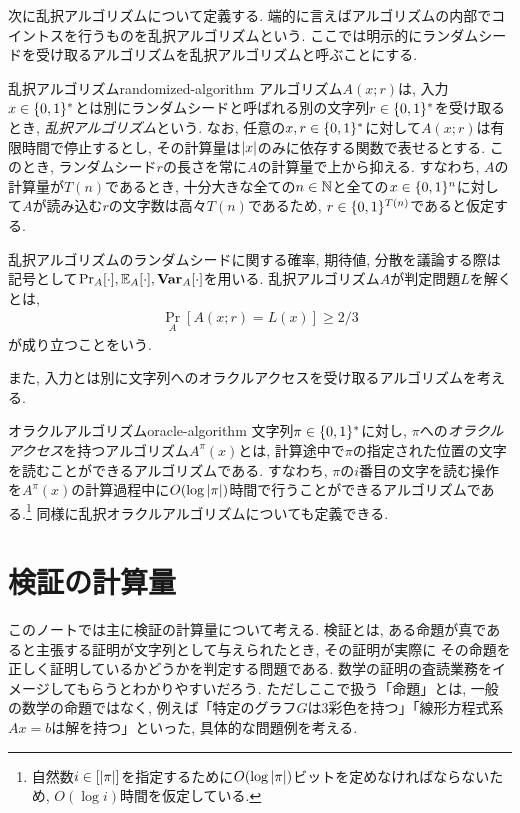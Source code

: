次に乱択アルゴリズムについて定義する. 端的に言えばアルゴリズムの内部でコイントスを行うものを乱択アルゴリズムという.
ここでは明示的にランダムシードを受け取るアルゴリズムを乱択アルゴリズムと呼ぶことにする.

\begin{definition}{乱択アルゴリズム}{randomized-algorithm}
  アルゴリズム$A(x;r)$は, 入力$x\in\{0,1\}^*$とは別にランダムシードと呼ばれる別の文字列$r\in\{0,1\}^*$を受け取るとき, \emph{乱択アルゴリズム}という.
  なお, 任意の$x,r\in\{0,1\}^*$に対して$A(x;r)$は有限時間で停止するとし, その計算量は$\abs{x}$のみに依存する関数で表せるとする.
  このとき, ランダムシード$r$の長さを常に$A$の計算量で上から抑える.
  すなわち, $A$の計算量が$T(n)$であるとき, 十分大きな全ての$n\in\mathbb{N}$と全ての$x\in\{0,1\}^n$に対して$A$が読み込む$r$の文字数は高々$T(n)$であるため, $r\in \{0,1\}^{T(n)}$であると仮定する.

  乱択アルゴリズムのランダムシードに関する確率, 期待値, 分散を議論する際は記号として$\Pr_{A}[\cdot],\operatorname*{\mathbb{E}}_A[\cdot],\operatorname*{\mathbf{Var}}_A[\cdot]$を用いる.
  乱択アルゴリズム$A$が判定問題$L$を解くとは,
  \begin{align*}
    \Pr_A[A(x;r)=L(x)]\geq 2/3
  \end{align*}
  が成り立つことをいう.
\end{definition}

また, 入力とは別に文字列へのオラクルアクセスを受け取るアルゴリズムを考える.
\begin{definition}{オラクルアルゴリズム}{oracle-algorithm}
  文字列$\pi\in\{0,1\}^*$に対し, $\pi$への\emph{オラクルアクセス}を持つアルゴリズム$A^\pi(x)$とは, 計算途中で$\pi$の指定された位置の文字を読むことができるアルゴリズムである.
  すなわち, $\pi$の$i$番目の文字を読む操作を$A^\pi(x)$の計算過程中に$O(\log \abs{\pi})$時間で行うことができるアルゴリズムである.\footnote{自然数$i\in[\abs{\pi}]$を指定するために$O(\log \abs{\pi})$ビットを定めなければならないため, $O(\log i)$時間を仮定している.}
  同様に乱択オラクルアルゴリズムについても定義できる.
\end{definition}


\section{検証の計算量}
このノートでは主に検証の計算量について考える.
検証とは, ある命題が真であると主張する証明が文字列として与えられたとき, その証明が実際に
その命題を正しく証明しているかどうかを判定する問題である.
数学の証明の査読業務をイメージしてもらうとわかりやすいだろう.
ただしここで扱う「命題」とは, 一般の数学の命題ではなく, 例えば「特定のグラフ$G$は3彩色を持つ」「線形方程式系$Ax=b$は解を持つ」といった, 具体的な問題例を考える.

